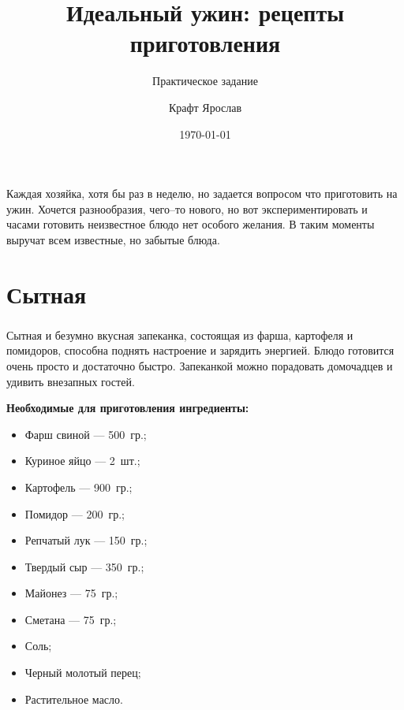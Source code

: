 \documentclass[t]{beamer}  %
\title{Идеальный ужин: рецепты приготовления}
\subtitle{Практическое задание}
\author{Крафт Ярослав}
\date{\today}
\begin{document}
\frame[plain]{\titlepage}
		
\begin{frame} \label{begin} %
	Каждая хозяйка, хотя бы раз в неделю, но задается вопросом что приготовить на ужин. Хочется разнообразия, чего--то нового, но вот экспериментировать и часами готовить неизвестное блюдо нет особого желания. В таким моменты выручат всем известные, но забытые блюда.	
\end{frame}
	
\section{Сытная}
\begin{frame}  %
\frametitle{\insertsection}
	Сытная и безумно вкусная запеканка, состоящая из фарша, картофеля и помидоров, способна поднять настроение и зарядить энергией. Блюдо готовится очень просто и достаточно быстро. Запеканкой можно порадовать домочадцев и удивить внезапных гостей. \pause
		
	\textbf{Необходимые для приготовления ингредиенты:}
	\begin{multicols}{2}
		\begin{itemize}
			\item Фарш свиной --- 500~гр.;
			\item Куриное яйцо --- 2~шт.;
			\item Картофель --- 900~гр.;  
			\item Помидор --- 200~гр.;
			\item Репчатый лук --- 150~гр.;
			\item Твердый сыр --- 350~гр.;
			\item Майонез --- 75~гр.;
			\item Сметана --- 75~гр.;
			\item Соль;
			\item Черный молотый перец;
			\item Растительное масло.
		\end{itemize}	
	\end{multicols}
\end{frame}
\end{document}
